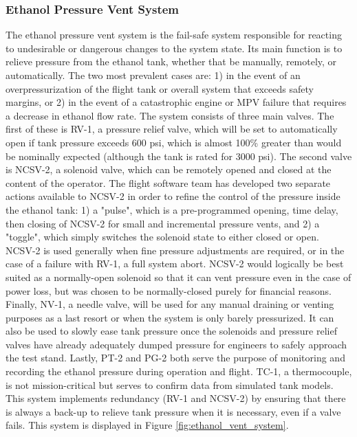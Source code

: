 \documentclass[9pt]{article} %
\numberwithin{equation}{section} %
\begin{document}
\subsubsection{Ethanol Pressure Vent System}
\hspace{\parindent} The ethanol pressure vent system is the fail-safe system responsible for reacting to undesirable or dangerous changes to the system state. Its main function is to relieve pressure from the ethanol tank, whether that be manually, remotely, or automatically. The two most prevalent cases are: 1) in the event of an overpressurization of the flight tank or overall system that exceeds safety margins, or 2) in the event of a catastrophic engine or MPV failure that requires a decrease in ethanol flow rate. The system consists of three main valves. The first of these is RV-1, a pressure relief valve, which will be set to automatically open if tank pressure exceeds 600 psi, which is almost 100\% greater than would be nominally expected (although the tank is rated for 3000 psi). The second valve is NCSV-2, a solenoid valve, which can be remotely opened and closed at the content of the operator. The flight software team has developed two separate actions available to NCSV-2 in order to refine the control of the pressure inside the ethanol tank: 1) a "pulse", which is a pre-programmed opening, time delay, then closing of NCSV-2 for small and incremental pressure vents, and 2) a "toggle", which simply switches the solenoid state to either closed or open. NCSV-2 is used generally when fine pressure adjustments are required, or in the case of a failure with RV-1, a full system abort. NCSV-2 would logically be best suited as a normally-open solenoid so that it can vent pressure even in the case of power loss, but was chosen to be normally-closed purely for financial reasons. Finally, NV-1, a needle valve, will be used for any manual draining or venting purposes as a last resort or when the system is only barely pressurized. It can also be used to slowly ease tank pressure once the solenoids and pressure relief valves have already adequately dumped pressure for engineers to safely approach the test stand. Lastly, PT-2 and PG-2 both serve the purpose of monitoring and recording the ethanol pressure during operation and flight. TC-1, a thermocouple, is not mission-critical but serves to confirm data from simulated tank models. This system implements redundancy (RV-1 and NCSV-2) by ensuring that there is always a back-up to relieve tank pressure when it is necessary, even if a valve fails. This system is displayed in Figure \ref{fig:ethanol_vent_system}.
\end{document}
